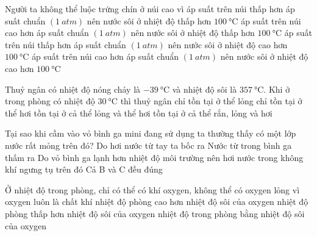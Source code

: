 \begin{ex}
Người ta không thể luộc trứng chín ở núi cao vì
\choice
{\True áp suất trên núi thấp hơn áp suất chuẩn $\left(\SI{1}{atm}\right)$ nên nước sôi ở nhiệt độ thấp hơn $\SI{100}{\celsius}$}
{ áp suất trên núi cao hơn áp suất chuẩn $\left(\SI{1}{atm}\right)$ nên nước sôi ở nhiệt độ thấp hơn $\SI{100}{\celsius}$}
{ áp suất trên núi thấp hơn áp suất chuẩn $\left(\SI{1}{atm}\right)$ nên nước sôi ở nhiệt độ cao hơn $\SI{100}{\celsius}$}
{ áp suất trên núi cao hơn áp suất chuẩn $\left(\SI{1}{atm}\right)$ nên nước sôi ở nhiệt độ cao hơn $\SI{100}{\celsius}$}
\loigiai{ }
\end{ex}
\begin{ex}
Thuỷ ngân có nhiệt độ nóng chảy là $\SI{-39}{\celsius}$ và nhiệt độ sôi là $\SI{357}{\celsius}$. Khi ở trong phòng có nhiệt độ $\SI{30}{\celsius}$ thì thuỷ ngân
\choice
{\True chỉ tồn tại ở thể lỏng}
{ chỉ tồn tại ở thể hơi}
{ tồn tại ở cả thể lỏng và thể hơi}
{ tồn tại ở cả thể rắn, lỏng và hơi}
\loigiai{ }
\end{ex}
\begin{ex}
Tại sao khi cầm vào vỏ bình ga mini đang sử dụng ta thường thấy có một lớp nước rất
mỏng trên đó?
\choice
{ Do hơi nước từ tay ta bốc ra}
{ Nước từ trong bình ga thấm ra}
{\True Do vỏ bình ga lạnh hơn nhiệt độ môi trường nên hơi nước trong không khí ngưng tụ trên đó}
{ Cả B và C đều đúng}
\loigiai{ }
\end{ex}
\begin{ex}
Ở nhiệt độ trong phòng, chỉ có thể có khí oxygen, không thể có oxygen lỏng vì
\choice
{ oxygen luôn là chất khí}
{\True nhiệt độ phòng cao hơn nhiệt độ sôi của oxygen}
{ nhiệt độ phòng thấp hơn nhiệt độ sôi của oxygen}
{ nhiệt độ trong phòng bằng nhiệt độ sôi của oxygen}
\loigiai{ }
\end{ex}


